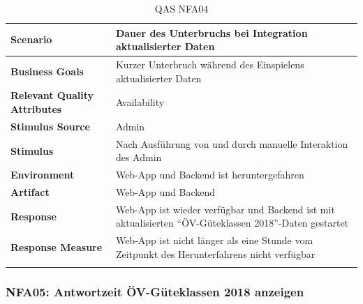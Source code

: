 \begin{longtable}{l p{10.6cm}}
        \toprule
        \textbf{Scenario}
                                & Dauer des Unterbruchs bei Integration aktualisierter Daten\\
        \midrule
        \textbf{Business Goals}
                                & Kurzer Unterbruch während des Einspielens aktualisierter Daten\\
        \textbf{Relevant Quality Attributes}
                                & Availability \\
        \textbf{Stimulus Source}
                                & Admin\\
        \textbf{Stimulus}
                                & Nach Ausführung von \nameref{Use Cases:UC01} und \nameref{Use Cases:UC05} durch manuelle Interaktion des Admin\\
        \textbf{Environment}
                                & Web-App und Backend ist heruntergefahren\\
        \textbf{Artifact}
                                & Web-App und Backend\\
        \textbf{Response}
                                & Web-App ist wieder verfügbar und Backend ist mit aktualisierten "`ÖV-Güteklassen 2018"'-Daten gestartet\\  
        \textbf{Response Measure}
                                & Web-App ist nicht länger als eine Stunde vom Zeitpunkt des Herunterfahrens nicht verfügbar\\                                
        \bottomrule
    \caption{QAS NFA04}
    \label{table:nfa04}
\end{longtable}

\subsubsection{NFA05: Antwortzeit ÖV-Güteklassen 2018 anzeigen}
\label{NFA:NFA05}


